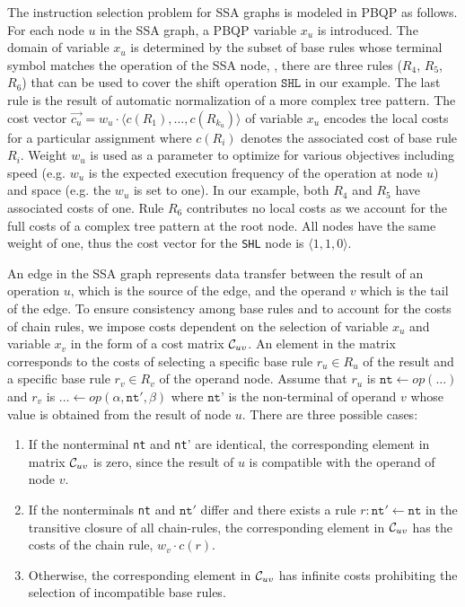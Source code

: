 The instruction selection problem for SSA graphs is modeled in PBQP as
follows. For each node $u$ in the SSA graph, a PBQP variable $x_u$ is
introduced. The domain of variable $x_u$ is determined by the subset
of base rules whose terminal symbol matches the operation of the SSA
node, \eg, there are three rules ($R_4$, $R_5$, $R_6$) that can be
used to cover the shift operation $\texttt{SHL}$ in our example. The
last rule is the result of automatic normalization of a more complex
tree pattern.
The cost vector $\vec{c_u}= w_u \cdot \langle c(R_1), \dots,
c(R_{k_u}) \rangle$ of variable $x_u$ encodes the local costs for a
particular assignment where $c(R_i)$ denotes the associated cost of
base rule $R_i$. Weight $w_u$ is used as a parameter to optimize for
various objectives including speed (e.g. $w_u$ is the expected
execution frequency of the operation at node $u$) and space (e.g. the
$w_u$ is set to one). In our example, both $R_4$ and $R_5$ have
associated costs of one. Rule $R_6$ contributes no local costs as we
account for the full costs of a complex tree pattern at the root
node. All nodes have the same weight of one, thus the cost vector for
the \texttt{SHL} node is $\langle1, 1, 0 \rangle$.

An edge in the SSA graph represents data transfer between the result
of an operation $u$, which is the source of the edge, and the operand
$v$ which is the tail of the edge.  To ensure consistency among base
rules and to account for the costs of chain rules, we impose costs
dependent on the selection of variable $x_u$ and variable $x_v$ in the
form of a cost matrix $\mathcal C_{uv}$. An element in the matrix
corresponds to the costs of selecting a specific base rule $r_u \in
R_u$ of the result and a specific base rule $r_v \in R_v$ of the
operand node. Assume that $r_u $ is $\texttt{nt} \leftarrow
\textit{op} (\dots)$ and $r_v$ is $\dots \leftarrow \textit{op}
(\alpha, \texttt{nt}', \beta)$ where $\texttt{nt'}$ is the
non-terminal of operand $v$ whose value is obtained from the result of
node $u$. There are three possible cases:
\begin{enumerate}
\item If the nonterminal \texttt{nt} and \texttt{nt}' are identical,
  the corresponding element in matrix $\mathcal C_{uv}$ is zero,
  since the result of $u$ is compatible with the operand of node $v$.
\item If the nonterminals \texttt{nt} and $\texttt{nt}'$ differ and
  there exists a rule $r: \texttt{nt}' \leftarrow \texttt{nt}$ in the
  transitive closure of all chain-rules, the corresponding element in
  $\mathcal C_{uv}$ has the costs of the chain rule, \ie $w_v \cdot
  c(r)$.
\item Otherwise, the corresponding element in $\mathcal C_{uv}$ has
  infinite costs prohibiting the selection of incompatible base rules.
\end{enumerate}

